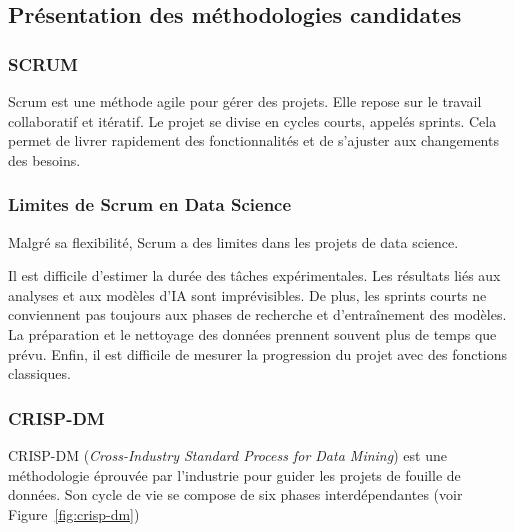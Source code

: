 \subsection{Présentation des méthodologies candidates}
\subsubsection{SCRUM}
Scrum est une méthode agile pour gérer des projets. Elle repose sur le travail collaboratif et itératif. Le projet se divise en cycles courts, appelés sprints. Cela permet de livrer rapidement des fonctionnalités et de s'ajuster aux changements des besoins.
\subsubsection{Limites de Scrum en Data Science}
Malgré sa flexibilité, Scrum a des limites dans les projets de data science. 

Il est difficile d'estimer la durée des tâches expérimentales. Les résultats liés aux analyses et aux modèles d'IA sont imprévisibles. De plus, les sprints courts ne conviennent pas toujours aux phases de recherche et d'entraînement des modèles. La préparation et le nettoyage des données prennent souvent plus de temps que prévu. Enfin, il est difficile de mesurer la progression du projet avec des fonctions classiques.
\subsubsection{CRISP-DM}

CRISP-DM (\textit{Cross-Industry Standard Process for Data Mining}) est une méthodologie
éprouvée par l'industrie pour guider les projets de fouille de données. Son cycle de vie
se compose de six phases interdépendantes (voir Figure~\ref{fig:crisp-dm})

